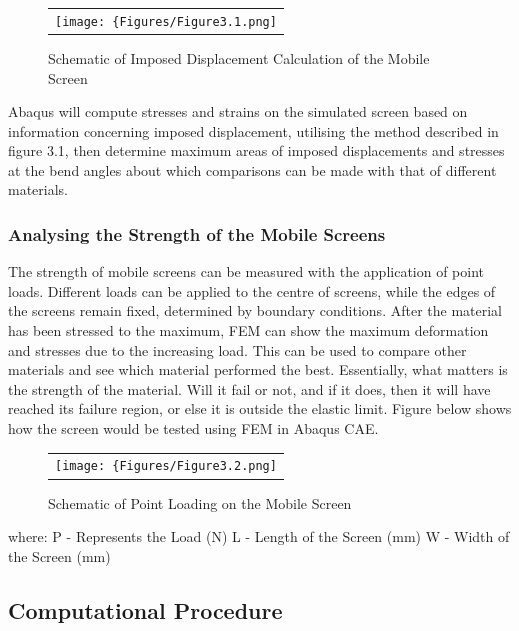 \documentclass[a4paper,12pt]{article}
\numberwithin{equation}{section}
\numberwithin{figure}{section}
\begin{document}
\begin{figure}[H]
  \centering
  \begin{tabular}{@{}c@{}}
    \texttt{[image: \{Figures/Figure3.1.png]}} \\
  \end{tabular}
  \caption{Schematic of Imposed Displacement Calculation of the Mobile Screen}
\end{figure}

\noindent Abaqus will compute stresses and strains on the simulated screen based on information concerning imposed displacement, utilising the method described in figure 3.1, then determine maximum areas of imposed displacements and stresses at the bend angles about which comparisons can be made with that of different materials.

\subsubsection{Analysing the Strength of the Mobile Screens}

\noindent The strength of mobile screens can be measured with the application of point loads. Different loads can be applied to the centre of screens, while the edges of the screens remain fixed, determined by boundary conditions. After the material has been stressed to the maximum, FEM can show the maximum deformation and stresses due to the increasing load. This can be used to compare other materials and see which material performed the best. Essentially, what matters is the strength of the material. Will it fail or not, and if it does, then it will have reached its failure region, or else it is outside the elastic limit. Figure below shows how the screen would be tested using FEM in Abaqus CAE.

\begin{figure}[H]
  \centering
  \begin{tabular}{@{}c@{}}
    \texttt{[image: \{Figures/Figure3.2.png]}} \\
  \end{tabular}
  \caption{Schematic of Point Loading on the Mobile Screen}
\end{figure}

\noindent where:\newline
P - Represents the Load (N)\newline
L - Length of the Screen (mm)\newline
W - Width of the Screen (mm)

\newpage
\subsection{Computational Procedure}
\end{document}
